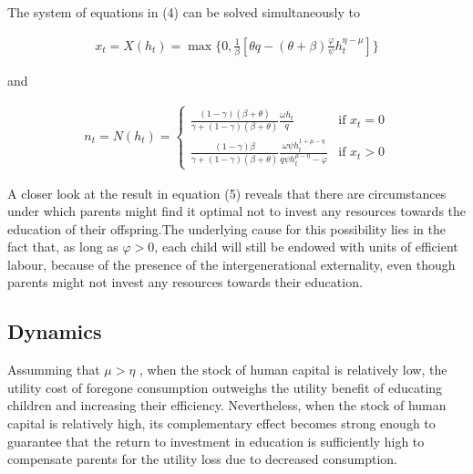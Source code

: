 The system of equations in (4) can be solved simultaneously to

    \begin{equation}
    \begin{aligned}
    x_t = X(h_t)  = \max \{0, \frac{1}{\beta}[\theta q - (\theta + \beta) \frac{\varphi}{\psi}  h_t^{\eta - \mu}]\}
    \end{aligned}
    \end{equation}
    
and

    \begin{equation}
    \begin{aligned}
    n_t = N(h_t)  = \begin{cases}
                    \frac{(1-\gamma)(\beta + \theta)}{\gamma + (1-\gamma)(\beta + \theta)} \frac{\omega h_t}{q} & \text{if } x_t = 0 \\
                    \frac{(1-\gamma)\beta}{\gamma + (1-\gamma)(\beta + \theta)} \frac{\omega \psi h_t^{1 + \mu - \eta }}{q \psi h_t^{\mu - \eta} - \varphi}   & \text{if } x_t > 0
                     \end{cases}
    \end{aligned}
    \end{equation}
    
A closer look at the result in equation (5) reveals that there are circumstances under which parents might find it optimal not to invest any
resources towards the education of their offspring.The underlying cause for this possibility lies in the fact that, as long as $ \varphi > 0$, each child will still be endowed with units of efficient labour, because of the presence of the intergenerational externality, even though parents might not invest any resources towards their education.\\

\subsection{Dynamics} 

Assumming that  $\mu > \eta $ , when the stock of human capital is relatively low, the utility cost of foregone consumption outweighs the utility
benefit of educating children and increasing their efficiency. Nevertheless, when the stock of human capital is relatively high, its complementary
effect becomes strong enough to guarantee that the return to investment in education is sufficiently high to compensate parents for the utility loss
due to decreased consumption.

